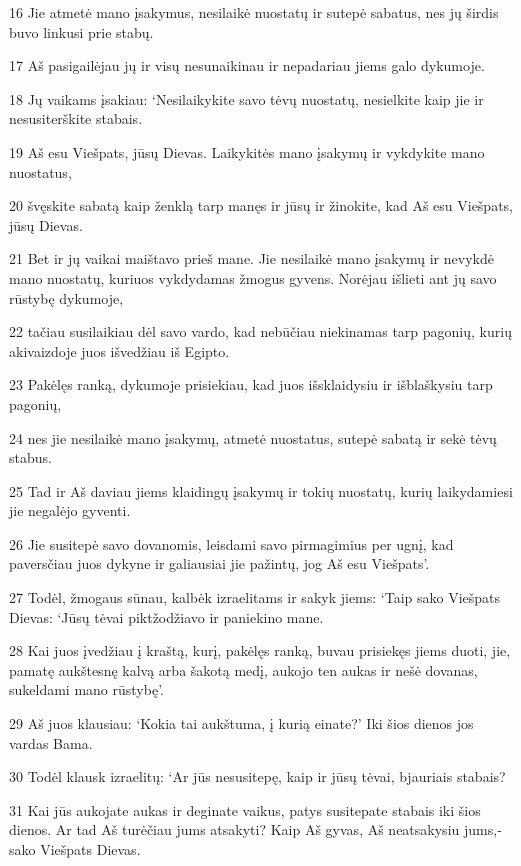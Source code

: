 \par 16 Jie atmetė mano įsakymus, nesilaikė nuostatų ir sutepė sabatus, nes jų širdis buvo linkusi prie stabų. 
\par 17 Aš pasigailėjau jų ir visų nesunaikinau ir nepadariau jiems galo dykumoje. 
\par 18 Jų vaikams įsakiau: ‘Nesilaikykite savo tėvų nuostatų, nesielkite kaip jie ir nesusiterškite stabais. 
\par 19 Aš esu Viešpats, jūsų Dievas. Laikykitės mano įsakymų ir vykdykite mano nuostatus, 
\par 20 švęskite sabatą kaip ženklą tarp manęs ir jūsų ir žinokite, kad Aš esu Viešpats, jūsų Dievas. 
\par 21 Bet ir jų vaikai maištavo prieš mane. Jie nesilaikė mano įsakymų ir nevykdė mano nuostatų, kuriuos vykdydamas žmogus gyvens. Norėjau išlieti ant jų savo rūstybę dykumoje, 
\par 22 tačiau susilaikiau dėl savo vardo, kad nebūčiau niekinamas tarp pagonių, kurių akivaizdoje juos išvedžiau iš Egipto. 
\par 23 Pakėlęs ranką, dykumoje prisiekiau, kad juos išsklaidysiu ir išblaškysiu tarp pagonių, 
\par 24 nes jie nesilaikė mano įsakymų, atmetė nuostatus, sutepė sabatą ir sekė tėvų stabus. 
\par 25 Tad ir Aš daviau jiems klaidingų įsakymų ir tokių nuostatų, kurių laikydamiesi jie negalėjo gyventi. 
\par 26 Jie susitepė savo dovanomis, leisdami savo pirmagimius per ugnį, kad paversčiau juos dykyne ir galiausiai jie pažintų, jog Aš esu Viešpats’. 
\par 27 Todėl, žmogaus sūnau, kalbėk izraelitams ir sakyk jiems: ‘Taip sako Viešpats Dievas: ‘Jūsų tėvai piktžodžiavo ir paniekino mane. 
\par 28 Kai juos įvedžiau į kraštą, kurį, pakėlęs ranką, buvau prisiekęs jiems duoti, jie, pamatę aukštesnę kalvą arba šakotą medį, aukojo ten aukas ir nešė dovanas, sukeldami mano rūstybę’. 
\par 29 Aš juos klausiau: ‘Kokia tai aukštuma, į kurią einate?’ Iki šios dienos jos vardas Bama. 
\par 30 Todėl klausk izraelitų: ‘Ar jūs nesusitepę, kaip ir jūsų tėvai, bjauriais stabais? 
\par 31 Kai jūs aukojate aukas ir deginate vaikus, patys susitepate stabais iki šios dienos. Ar tad Aš turėčiau jums atsakyti? Kaip Aš gyvas, Aš neatsakysiu jums,­sako Viešpats Dievas.­ 
